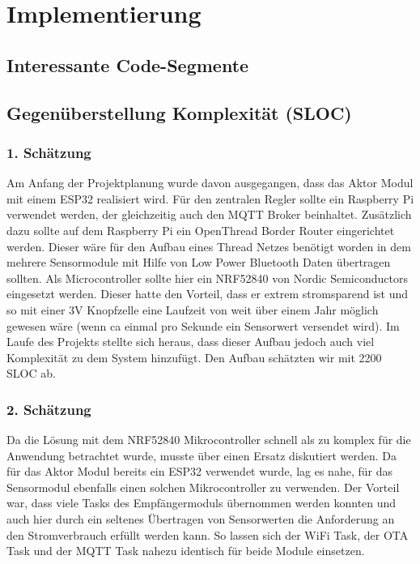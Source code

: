 \chapter{Implementierung}
\label{cha:Implementierung}

\section{Interessante Code-Segmente}

\section{Gegenüberstellung Komplexität (SLOC)}
\subsection{1. Schätzung}
Am Anfang der Projektplanung wurde davon ausgegangen, dass das Aktor Modul mit einem ESP32 realisiert wird. Für den zentralen Regler sollte ein Raspberry Pi verwendet werden, der gleichzeitig auch den MQTT Broker beinhaltet. Zusätzlich dazu sollte auf dem Raspberry Pi ein OpenThread Border Router eingerichtet werden. Dieser wäre für den Aufbau eines Thread Netzes benötigt worden in dem mehrere Sensormodule mit Hilfe von Low Power Bluetooth Daten übertragen sollten. Als Microcontroller sollte hier ein NRF52840 von Nordic Semiconductors eingesetzt werden. Dieser hatte den Vorteil, dass er extrem stromsparend ist und so mit einer 3V Knopfzelle eine Laufzeit von weit über einem Jahr möglich gewesen wäre (wenn ca einmal pro Sekunde ein Sensorwert versendet wird). Im Laufe des Projekts stellte sich heraus, dass dieser Aufbau jedoch auch viel Komplexität zu dem System hinzufügt. Den Aufbau schätzten wir mit 2200 SLOC ab.
\subsection{2. Schätzung}
\label{cha:projektplanung_2schaetzung}
Da die Lösung mit dem NRF52840 Mikrocontroller schnell als zu komplex für die Anwendung betrachtet wurde, musste über einen Ersatz diskutiert werden. Da für das Aktor Modul bereits ein ESP32 verwendet wurde, lag es nahe, für das Sensormodul ebenfalls einen solchen Mikrocontroller zu verwenden. Der Vorteil war, dass viele Tasks des Empfängermoduls übernommen werden konnten und auch hier durch ein seltenes Übertragen von Sensorwerten die Anforderung an den Stromverbrauch erfüllt werden kann. So lassen sich der WiFi Task, der OTA Task und der MQTT Task nahezu identisch für beide Module einsetzen.

